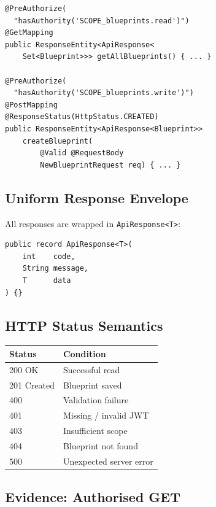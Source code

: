 \documentclass[10pt,a4paper,twocolumn]{article}
\begin{document}
\begin{lstlisting}[style=javacode, caption={@PreAuthorize on GET and POST}]
@PreAuthorize(
  "hasAuthority('SCOPE_blueprints.read')")
@GetMapping
public ResponseEntity<ApiResponse<
    Set<Blueprint>>> getAllBlueprints() { ... }

@PreAuthorize(
  "hasAuthority('SCOPE_blueprints.write')")
@PostMapping
@ResponseStatus(HttpStatus.CREATED)
public ResponseEntity<ApiResponse<Blueprint>>
    createBlueprint(
        @Valid @RequestBody
        NewBlueprintRequest req) { ... }
\end{lstlisting}

\subsection{Uniform Response Envelope}

All responses are wrapped in \texttt{ApiResponse\textless{}T\textgreater{}}:

\begin{lstlisting}[style=javacode, caption={ApiResponse record}]
public record ApiResponse<T>(
    int    code,
    String message,
    T      data
) {}
\end{lstlisting}

\subsection{HTTP Status Semantics}

\begin{center}
\small
\begin{tabular}{@{}ll@{}}
\toprule
\textbf{Status} & \textbf{Condition} \\
\midrule
200 OK      & Successful read \\
201 Created & Blueprint saved \\
400         & Validation failure \\
401         & Missing / invalid JWT \\
403         & Insufficient scope \\
404         & Blueprint not found \\
500         & Unexpected server error \\
\bottomrule
\end{tabular}
\end{center}

\subsection{Evidence: Authorised GET}
\end{document}
